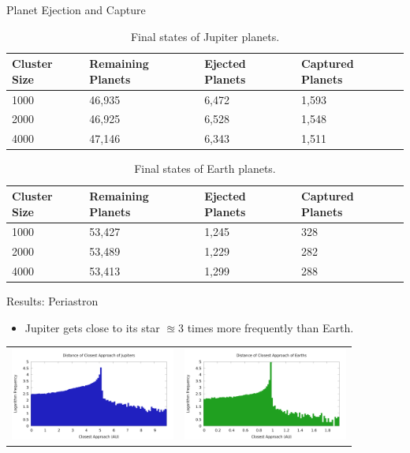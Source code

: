 \documentclass{beamer}
\begin{document}
\begin{frame}{Planet Ejection and Capture}
    \begin{table}[H]
        \centering
        \tiny
        \caption{Final states of Jupiter planets.}
        \begin{tabular}{|llll|}
            \hline
            \textbf{Cluster Size} & \textbf{Remaining Planets} & \textbf{Ejected Planets} & \textbf{Captured Planets} \\
            \hline
            1000 & 46,935 & 6,472 & 1,593 \\
            2000 & 46,925 & 6,528 & 1,548 \\
            4000 & 47,146 & 6,343 & 1,511 \\
            \hline
        \end{tabular}
    \end{table}
    \begin{table}[H]
        \centering
        \tiny
        \caption{Final states of Earth planets.}
        \begin{tabular}{|llll|}
            \hline
            \textbf{Cluster Size} & \textbf{Remaining Planets} & \textbf{Ejected Planets} & \textbf{Captured Planets} \\
            \hline
            1000 & 53,427 & 1,245 & 328 \\
            2000 & 53,489 & 1,229 & 282 \\
            4000 & 53,413 & 1,299 & 288 \\
            \hline
        \end{tabular}
    \end{table}
\end{frame}

\begin{frame}{Results: Periastron}
    \begin{itemize}
        \item Jupiter gets close to its star $\approxeq 3$ times more frequently than Earth.
    \end{itemize}
    \begin{tabular}{cc}
        \includegraphics[height=1.20in]{periastron_jupiter_1000.png} &
        \includegraphics[height=1.20in]{periastron_earth_1000.png}
    \end{tabular}
\end{frame}
\end{document}
